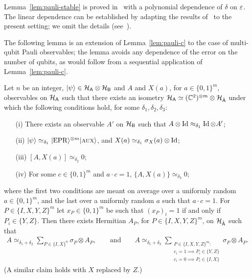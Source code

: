 Lemma~\ref{lem:pauli-stable} is proved in~\cite{natarajan2016robust} with a polynomial dependence of $\delta$ on $\varepsilon$. The linear dependence can be established by adapting the results of~\cite{gowers2015inverse} to the present setting; we omit the details (see~\cite{ghblog}). 

The following lemma is an extension of Lemma~\ref{lem:pauli-c} to the case of multi-qubit Pauli observables; the lemma avoids any dependence of the error on the number of qubits, as would follow from a sequential application of Lemma~\ref{lem:pauli-c}.

\begin{lemma}\label{lem:pauli-c-n}
Let $n$ be an integer, $|\psi\rangle \in \mathcal{H}_{{\textsf{A}}} \otimes \mathcal{H}_{{\textsf{B}}}$ and $A$ and $X(a)$, for $a\in\{0,1\}^m$, observables on $\mathcal{H}_{{\textsf{A}}}$ such that there exists an isometry $\mathcal{H}_{{\textsf{A}}} \simeq (\mathbb{C}^2)^{\otimes m}\otimes \mathcal{H}_{\hat{{\textsf{A}}}}$ under which the following conditions hold, for some $\delta_1,\delta_2,\delta_3$:
\begin{enumerate}
\item[(i)] There exists an observable $A'$ on $\mathcal{H}_{\textsf{B}}$ such that $A\otimes \mathop{\rm Id}\nolimits \approx_{\delta_1} \mathop{\rm Id}\nolimits \otimes A'$;
\item[(ii)] $|\psi\rangle \simeq_{\delta_1} |{\rm EPR}\rangle^{\otimes m}|\textsc {aux}\rangle$, and $X(a)\simeq_{\delta_1} \sigma_X(a) \otimes \mathop{\rm Id}\nolimits$;
\item[(iii)] $[A,X(a)]\simeq_{\delta_2} 0$;
\item[(iv)] For some $c\in\{0,1\}^m$ and $a\cdot c=1$, $\{A,X(a)\} \simeq_{\delta_3} 0$;
\end{enumerate}
where the first two conditions are meant on average over a uniformly random $a\in\{0,1\}^m$, and the last over a uniformly random $a$ such that $a\cdot c =1$. For $P\in\{I,X,Y,Z\}^m$ let $x_P \in\{0,1\}^m$ be such that $(x_P)_i=1$ if and only if $P_i\in\{Y,Z\}$.
Then there exists Hermitian $A_P$, for $P\in\{I,X,Y,Z\}^m$, on $\mathcal{H}_{\hat{{\textsf{A}}}}$ such that 
\begin{align*}
A \simeq_{\delta_1+\delta_2} \sum_{P\in\{I,X\}^n} \sigma_P \otimes A_P,\qquad\text{and}\qquad A \simeq_{\delta_1+\delta_3} \sum_{\substack{P\in\{I,X,Y,Z\}^m:\\ c_i=1 \implies P_i \in \{Y,Z\}\\  c_i=0 \implies P_i \in \{I,X\}}} \sigma_P \otimes A_P.
\end{align*}
 (A similar claim holds with $X$ replaced by $Z$.)
\end{lemma}

